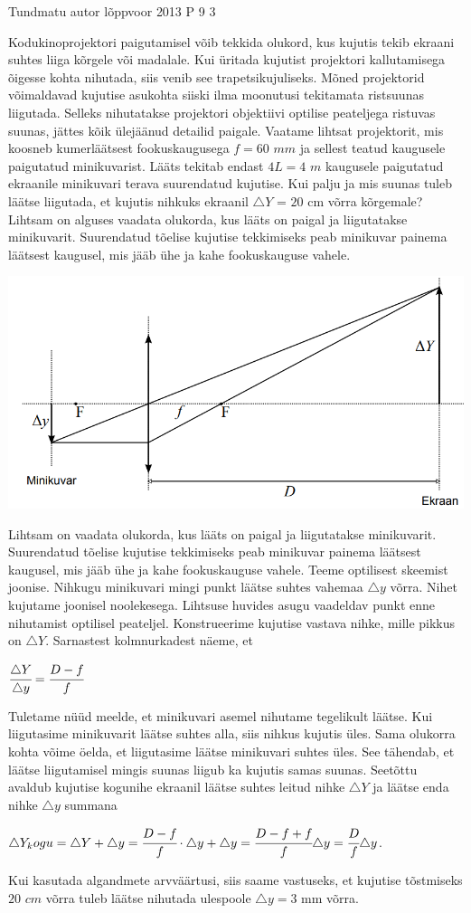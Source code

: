 {Tundmatu autor} %
{lõppvoor} %
{2013} %
{P 9} %
{3} %
{
\ifStatement
Kodukinoprojektori paigutamisel võib tekkida olukord, kus kujutis tekib ekraani suhtes liiga kõrgele või madalale. Kui üritada kujutist projektori kallutamisega õigesse kohta nihutada, siis venib see trapetsikujuliseks. Mõned projektorid võimaldavad kujutise asukohta siiski ilma moonutusi tekitamata ristsuunas liigutada. Selleks nihutatakse projektori objektiivi optilise peateljega ristuvas suunas, jättes kõik ülejäänud detailid paigale. Vaatame lihtsat projektorit, mis koosneb kumerläätsest fookuskaugusega $f = 60$ $mm$ ja sellest teatud kaugusele paigutatud minikuvarist. Lääts tekitab endast $4L = 4$ $m$ kaugusele paigutatud ekraanile minikuvari terava suurendatud kujutise. Kui palju ja mis suunas tuleb läätse liigutada, et kujutis nihkuks ekraanil $\triangle$$Y$ = $20$ cm võrra kõrgemale?
\fi
\ifHint
Lihtsam on alguses vaadata olukorda, kus lääts on paigal ja liigutatakse minikuvarit. Suurendatud tõelise kujutise tekkimiseks peab minikuvar painema läätsest kaugusel, mis jääb ühe ja kahe fookuskauguse vahele.
\fi
\ifSolution
\begin{center}
	\includegraphics[width=0.5\linewidth]{2013-v3p-09-lah.PNG}
\end{center}
Lihtsam on vaadata olukorda, kus lääts on paigal ja liigutatakse minikuvarit. Suurendatud tõelise kujutise tekkimiseks peab minikuvar painema läätsest kaugusel, mis jääb ühe ja kahe fookuskauguse vahele. Teeme optilisest skeemist joonise. Nihkugu minikuvari mingi punkt läätse suhtes vahemaa $\triangle y$ võrra. Nihet kujutame joonisel noolekesega. Lihtsuse huvides asugu vaadeldav punkt enne nihutamist optilisel peateljel. Konstrueerime kujutise vastava nihke, mille pikkus on $\triangle Y$. Sarnastest kolmnurkadest näeme, et
\begin{center}
$\cfrac {\triangle Y }{\triangle y} =  \cfrac {D - f}{f}$
\end{center}
Tuletame nüüd meelde, et minikuvari asemel nihutame tegelikult läätse. Kui liigutasime minikuvarit läätse suhtes alla, siis nihkus kujutis üles. Sama olukorra kohta võime öelda, et liigutasime läätse minikuvari suhtes üles. See tähendab, et läätse liigutamisel mingis suunas liigub ka kujutis samas suunas. Seetõttu avaldub kujutise kogunihe ekraanil läätse suhtes leitud nihke $\triangle Y$ ja läätse enda nihke $\triangle y$ summana 
\begin{center}
$\triangle Y_kogu = \triangle Y + \triangle y = \cfrac{D - f}{f} \cdot \triangle y + \triangle y = \cfrac{D - f + f}{f} \triangle y = \cfrac{D}{f} \triangle y$. 
\end{center}
Kui kasutada algandmete arvväärtusi, siis saame vastuseks, et kujutise tõstmiseks $20$ $cm$ võrra tuleb läätse nihutada ulespoole $\triangle y = 3$ mm võrra. 
\fi
}